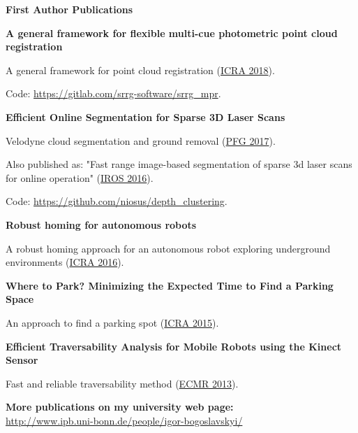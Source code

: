 \documentclass[a4paper,12pt,final]{memoir}
\newcommand{\SmallSep}{\vspace{0.5em}}
\newcommand{\CVSection}[1]
	{\Large\textbf{#1}\par
	\SmallSep\normalsize\normalfont}
\newcommand{\CVItem}[1]
	{\textbf{\color{MidnightBlue} #1}}
\begin{document}
\CVSection{First Author Publications}
\CVItem{A general framework for flexible multi-cue photometric point cloud registration}
\begin{compactitem}[\color{MidnightBlue}$\circ$]
	\item A general framework for point cloud registration (\href{http://icra2018.org/}{ICRA 2018}).
	\item Code: \url{https://gitlab.com/srrg-software/srrg_mpr}.
\end{compactitem}
\CVItem{Efficient Online Segmentation for Sparse 3D Laser Scans}
\begin{compactitem}[\color{MidnightBlue}$\circ$]
	\item Velodyne cloud segmentation and ground removal (\href{https://link.springer.com/article/10.1007/s41064-016-0003-y}{PFG 2017}).
	\item Also published as: "Fast range image-based segmentation of sparse 3d
	laser scans for online operation" (\href{http://iros2016.org/}{IROS 2016}).
	\item Code: \url{https://github.com/niosus/depth_clustering}.
\end{compactitem}
\CVItem{Robust homing for autonomous robots}
\begin{compactitem}[\color{MidnightBlue}$\circ$]
	\item A robust homing approach for an autonomous robot exploring underground
	environments (\href{http://icra2016.org/}{ICRA 2016}).
\end{compactitem}
\CVItem{Where to Park? Minimizing the Expected Time to Find a Parking Space}
\begin{compactitem}[\color{MidnightBlue}$\circ$]
	\item An approach to find a parking spot (\href{http://icra2015.org/}{ICRA 2015}).
\end{compactitem}
\CVItem{Efficient Traversability Analysis for Mobile Robots using the Kinect Sensor}
\begin{compactitem}[\color{MidnightBlue}$\circ$]
	\item Fast and reliable traversability method
	(\href{http://www.iri.upc.edu/ecmr13/#home}{ECMR 2013}).
\end{compactitem}
\CVItem{More publications on my university web page:}\\
\url{http://www.ipb.uni-bonn.de/people/igor-bogoslavskyi/}\\

\clearpage
\framebreak

\end{document}
